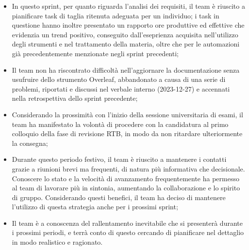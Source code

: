 \documentclass[10pt, a4paper]{article}
\begin{document}
{{{{{{{{{{{{{{{{{\begin{itemize}
    che tenesse conto di tali festività, il team è riuscito a portare a termine i task assegnati all'inizio dello sprint;
    \item In questo sprint, per quanto riguarda l'analisi dei requisiti, il team è riuscito a pianificare task di taglia ritenuta adeguata per un individuo; i task in questione hanno inoltre 
    presentato un rapporto ore produttive ed effettive che evidenzia un trend positivo, conseguito dall'eseprienza acquisita nell'utilizzo degli strumenti e nel trattamento della materia, oltre
    che per le automazioni già precedentemente menzionate negli sprint precedenti; 
    \item Il team non ha riscontrato difficoltà nell'aggiornare la documentazione senza usufruire dello strumento Overleaf, abbandonato a causa di una serie di problemi, riportati e 
    discussi nel verbale interno (2023-12-27) e accennati nella retrospettiva dello sprint precedente;
    \item Considerando la prossimità con l'inizio della sessione universitaria di esami, il team ha manifestato la volontà di procedere con la candidatura al primo colloquio della fase di revisione RTB, in modo da non ritardare ulteriormente la consegna;
    \item Durante questo periodo festivo, il team è riuscito a mantenere i contatti grazie a riunioni brevi ma frequenti, di natura più informativa che decisionale. Conoscere lo stato e la velocità di avanzamento frequentemente ha permesso al team di 
    lavorare più in sintonia, aumentando la collaborazione e lo spirito di gruppo. Considerando questi benefici, il team ha deciso di mantenere l'utilizzo di questa strategia anche per i prossimi sprint;
    \item Il team è a conoscenza del rallentamento inevitabile che si presenterà durante i prossimi periodi, e terrà conto di questo cercando di pianificare nel dettaglio in modo realistico e ragionato. 
\end{itemize}

}}}}}}}}}}}}}}}}}
\end{document}
